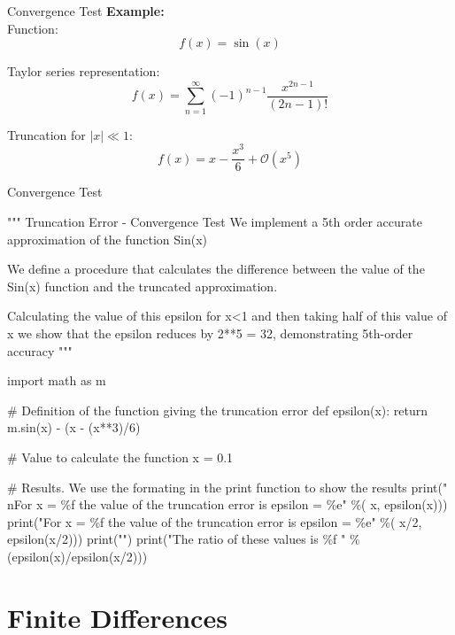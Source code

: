 \documentclass[11pt]{beamer}
\begin{document}
\begin{frame}[fragile]{Convergence Test}
\textbf{Example:}\\
Function:
\begin{equation}
f(x) = \sin (x)
\end{equation}

Taylor series representation:
\begin{equation}
f(x) = \sum_{n=1}^\infty (-1)^{n-1} \frac{x^{2n-1}}{(2n-1)!}
\end{equation}

Truncation for $ \left| x \right| \ll 1 $:
\begin{equation}
f(x) = x - \frac{x^3}{6} + \mathcal{O} (x^5)
\end{equation}
\end{frame}

\begin{frame}[fragile]{Convergence Test}
\tiny
\begin{semiverbatim}
""" 
Truncation Error - Convergence Test
We implement a 5th order accurate approximation of the function Sin(x)

We define a procedure that calculates the difference between the value of 
the Sin(x) function and the truncated approximation. 

Calculating the value of this epsilon for x<1 and then taking half of 
this value of x we show that the epsilon reduces by 2**5 = 32, 
demonstrating 5th-order accuracy
"""

import math as m
 
# Definition of the function giving the truncation error
def epsilon(x):
    return m.sin(x) - (x - (x**3)/6)

# Value to calculate the function
x = 0.1

# Results. We use the formating in the print function to show the results
print("\\nFor x = \%f the value of the truncation error is epsilon = \%e" \%( x, epsilon(x)))
print("For x = \%f the value of the truncation error is epsilon = \%e" \%( x/2, epsilon(x/2)))
print("")
print("The ratio of these values is \%f " \%(epsilon(x)/epsilon(x/2)))
\end{semiverbatim}
\end{frame}

\section{Finite Differences}
\end{document}
